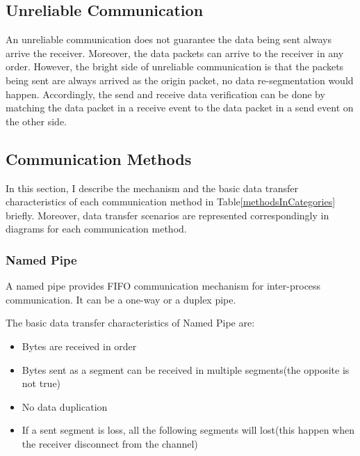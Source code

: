 \subsection{Unreliable Communication}\label{unreliable}
An unreliable communication does not guarantee the data being sent always arrive the receiver. Moreover, the data packets can arrive to the receiver in any order. However, the bright side of unreliable communication is that the packets being sent are always arrived as the origin packet, no data re-segmentation would happen. Accordingly, the send and receive data verification can be done by matching the data packet in a receive event to the data packet in a send event on the other side.

\subsection{Communication Methods}
In this section, I describe the mechanism and the basic data transfer characteristics of each communication method in Table\ref{methodsInCategories} briefly. Moreover, data transfer scenarios are represented correspondingly in diagrams for each communication method. 
 
\subsubsection{Named Pipe}
A named pipe provides FIFO communication mechanism for inter-process communication. It can be a one-way or a duplex pipe. \cite{khambattinamed}

The basic data transfer characteristics of Named Pipe are:
\begin{itemize}
  \item Bytes are received in order
  \item Bytes sent as a segment can be received in multiple segments(the opposite is not true)
  \item No data duplication
  \item If a sent segment is loss, all the following segments will lost(this happen when the receiver disconnect from the channel) 
  
\end{itemize}

